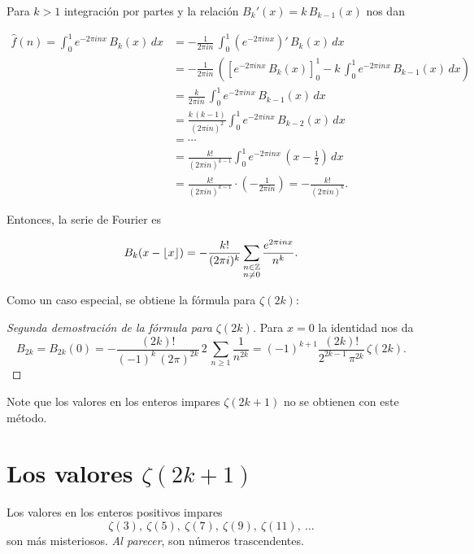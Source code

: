 \documentclass{article}
\begin{document}
Para $k > 1$ integración por partes y la relación $B_k' (x) = k\,B_{k-1} (x)$ nos dan

\begin{align*}
\widehat{f} (n) = \int_0^1 e^{-2\pi i n x} \, B_k (x)\,dx & = -\frac{1}{2\pi i n}\,\int_0^1 (e^{-2\pi i n x})' \, B_k (x)\,dx \\
 & = -\frac{1}{2\pi i n}\,\left(\left[e^{-2\pi i n x}\,B_k (x)\right]_0^1 - k\,\int_0^1 e^{-2\pi i n x} \, B_{k-1} (x)\,dx\right) \\
 & = \frac{k}{2\pi i n} \, \int_0^1 e^{-2\pi i n x}\,B_{k-1} (x)\,dx \\
 & = \frac{k\,(k-1)}{(2\pi i n)^2} \int_0^1 e^{-2\pi i n x}\,B_{k-2} (x)\,dx \\
 & = \cdots \\
 & = \frac{k!}{(2\pi i n)^{k-1}} \int_0^1 e^{-2\pi i n x}\,\left(x - \frac{1}{2}\right)\,dx \\
 & = \frac{k!}{(2\pi i n)^{k-1}} \cdot \left(-\frac{1}{2\pi i n}\right) = -\frac{k!}{(2\pi i n)^k}.
\end{align*}

Entonces, la serie de Fourier es

\begin{equation}
\label{serie-de-forier-para-Bk}
B_k (x - \lfloor x\rfloor) = -\frac{k!}{(2\pi i)^k}\sum_{\substack{n\in \mathbb{Z} \\ n \ne 0}} \frac{e^{2\pi i n x}}{n^k}.
\end{equation}

Como un caso especial, se obtiene la fórmula para $\zeta (2k)$:

\begin{proof}[Segunda demostración de la fórmula para $\zeta (2k)$]
Para $x = 0$ la identidad  nos da
$$B_{2k} = B_{2k} (0) = -\frac{(2k)!}{(-1)^k\,(2\pi)^{2k}} \, 2\,\sum_{n \ge 1} \frac{1}{n^{2k}} = (-1)^{k+1}\frac{(2k)!}{2^{2k-1}\,\pi^{2k}}\,\zeta (2k).$$
\end{proof}

Note que los valores en los enteros impares $\zeta (2k+1)$ no se obtienen con este método.


\section*{Los valores $\zeta (2k+1)$}

Los valores en los enteros positivos impares
$$\zeta (3), ~ \zeta (5), ~ \zeta (7), ~ \zeta (9), ~ \zeta (11), ~ \ldots$$
son más misteriosos. \emph{Al parecer}, son números trascendentes.
\end{document}
